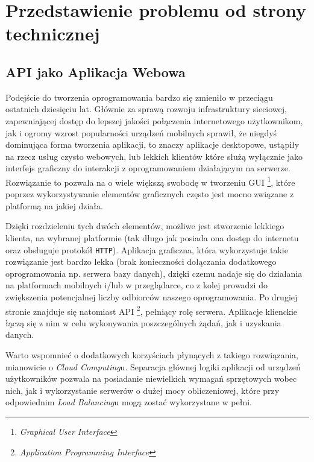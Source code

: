 \chapter{Przedstawienie problemu od strony technicznej}
\label{cha:przedstawienieProblemuOdStronyTechnicznej}

\section{API jako Aplikacja Webowa}

\par Podejście do tworzenia oprogramowania bardzo się zmieniło w przeciągu ostatnich dziesięciu lat. Głównie za sprawą rozwoju infrastruktury sieciowej, zapewniającej dostęp do lepszej jakości połączenia internetowego użytkownikom, jak i ogromy wzrost popularności urządzeń mobilnych sprawił, że niegdyś dominująca forma tworzenia aplikacji, to znaczy aplikacje desktopowe, ustąpiły na rzecz usług czysto webowych, lub lekkich klientów które służą wyłącznie jako interfejs graficzny do interakcji z oprogramowaniem działającym na serwerze.
Rozwiązanie to pozwala na o wiele większą swobodę w tworzeniu GUI \footnote{\emph{Graphical User Interface}}, które poprzez wykorzystywanie elementów graficznych często jest mocno związane z platformą na jakiej działa.

\par Dzięki rozdzieleniu tych dwóch elementów, możliwe jest stworzenie lekkiego klienta, na wybranej platformie (tak długo jak posiada ona dostęp do internetu oraz obsługuje protokół \verb|HTTP|). Aplikacja graficzna, która wykorzystuje takie rozwiązanie jest bardzo lekka (brak konieczności dołączania dodatkowego oprogramowania np. serwera bazy danych), dzięki czemu nadaje się do działania na platformach mobilnych i/lub w przeglądarce, co z kolej prowadzi do zwiększenia potencjalnej liczby odbiorców naszego oprogramowania. Po drugiej stronie znajduje się natomiast API \footnote{\emph{Application Programming Interface}}, pełniący rolę serwera. Aplikacje klienckie łączą się z nim w celu wykonywania poszczególnych żądań, jak i uzyskania danych.

\par Warto wspomnieć o dodatkowych korzyściach płynących z takiego rozwiązania, mianowicie o \emph{Cloud Computing}u. Separacja głównej logiki aplikacji od urządzeń użytkowników pozwala na posiadanie niewielkich wymagań sprzętowych wobec nich, jak i wykorzystanie serwerów o dużej mocy obliczeniowej, które przy odpowiednim \emph{Load Balancing}u mogą zostać wykorzystane w pełni.

